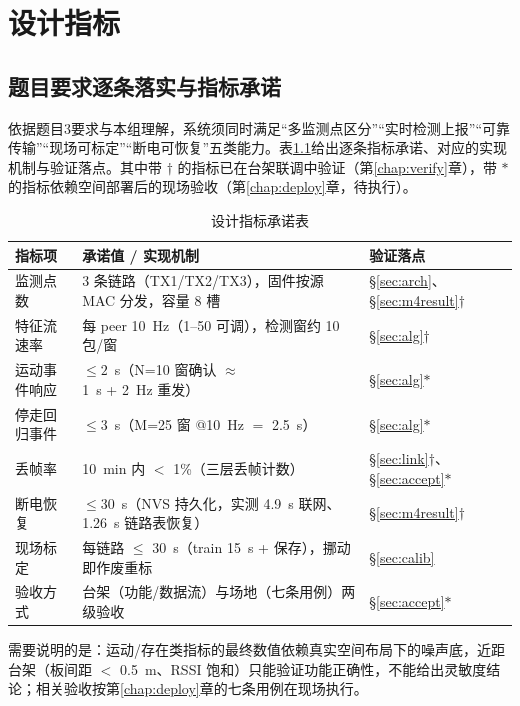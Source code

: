 \chapter{设计指标}

\section{题目要求逐条落实与指标承诺}

依据题目3要求与本组理解，系统须同时满足“多监测点区分”“实时检测上报”“可靠传输”“现场可标定”“断电可恢复”五类能力。表\ref{tab:metric}给出逐条指标承诺、对应的实现机制与验证落点。其中带 $\dagger$ 的指标已在台架联调中验证（第\ref{chap:verify}章），带 $\ast$ 的指标依赖空间部署后的现场验收（第\ref{chap:deploy}章，待执行）。

\begin{table}[htbp]
  \centering
  \caption{设计指标承诺表}
  \label{tab:metric}
  \begin{tabular}{p{4.6cm}p{4.6cm}p{4.2cm}}
    \toprule
    \textbf{指标项} & \textbf{承诺值 / 实现机制} & \textbf{验证落点} \\
    \midrule
    监测点数 & 3 条链路（TX1/TX2/TX3），固件按源 MAC 分发，容量 8 槽 & \S\ref{sec:arch}、\S\ref{sec:m4result}$\dagger$ \\
    特征流速率 & 每 peer 10~Hz（1--50 可调），检测窗约 10 包/窗 & \S\ref{sec:alg}$\dagger$ \\
    运动事件响应 & $\le 2$~s（N=10 窗确认 $\approx$1~s + 2~Hz 重发） & \S\ref{sec:alg}$\ast$ \\
    停走回归事件 & $\le 3$~s（M=25 窗 @10~Hz $=$ 2.5~s） & \S\ref{sec:alg}$\ast$ \\
    丢帧率 & 10~min 内 $<$ 1\%（三层丢帧计数） & \S\ref{sec:link}$\dagger$、\S\ref{sec:accept}$\ast$ \\
    断电恢复 & $\le 30$~s（NVS 持久化，实测 4.9~s 联网、1.26~s 链路表恢复） & \S\ref{sec:m4result}$\dagger$ \\
    现场标定 & 每链路 $\le$ 30~s（train 15~s + 保存），挪动即作废重标 & \S\ref{sec:calib} \\
    验收方式 & 台架（功能/数据流）与场地（七条用例）两级验收 & \S\ref{sec:accept}$\ast$ \\
    \bottomrule
  \end{tabular}
\end{table}

需要说明的是：运动/存在类指标的最终数值依赖真实空间布局下的噪声底，近距台架（板间距 $<$ 0.5~m、RSSI 饱和）只能验证功能正确性，不能给出灵敏度结论；相关验收按第\ref{chap:deploy}章的七条用例在现场执行。
